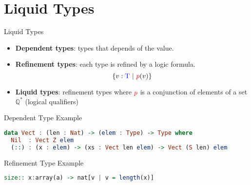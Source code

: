 \section{Liquid Types}



\begin{frame}{Liquid Types}
\begin{itemize}
    \item \textbf{Dependent types}: types that depends of the value.
    \item \textbf{Refinement types}: each {\color{blue} type} is refined by a  {\color{red} logic formula}.
    \[
        \{v:\text{\color{blue} T}\ |\ {\color{red} p}(v)\}
    \]
    \item \textbf{Liquid types}: refinement types where ${\color{red} p}$ is a conjunction of elements of a set $\mathbb{Q}^*$ (logical qualifiers)
\end{itemize}

\end{frame}

\begin{frame}[containsverbatim]{Dependent Type Example}
\begin{lstlisting}[language=haskell]
data Vect : (len : Nat) -> (elem : Type) -> Type where
  Nil  : Vect Z elem
  (::) : (x : elem) -> (xs : Vect len elem) -> Vect (S len) elem
\end{lstlisting}
\end{frame}

\begin{frame}[containsverbatim]{Refinement Type Example}
\begin{lstlisting}[language=haskell]
size:: x:array(a) -> nat[v | v = length(x)]
\end{lstlisting}
\end{frame}